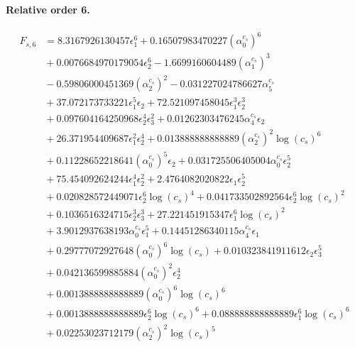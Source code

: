 \documentclass[10pt]{article}
\begin{document}
\paragraph{Relative order 6.}
\begin{align*}
F_{s,6} &= 8.3167926130457 \epsilon_{1}^{6} + 0.16507983470227 \left(\alpha_{0}^{c_s}\right)^{6} \\
&{}  + 0.0076684970179054 \epsilon_{2}^{6} - 1.6699160604489 \left(\alpha_{1}^{c_s}\right)^{3} \\
&{}  - 0.59806000451369 \left(\alpha_{2}^{c_s}\right)^{2} - 0.031227024786627 \alpha_{5}^{c_s} \\
&{}  + 37.072173733221 \epsilon_{1}^{5} \epsilon_{2} + 72.521097458045 \epsilon_{1}^{3} \epsilon_{2}^{3} \\
&{}  + 0.097604164250968 \epsilon_{2}^{4} \epsilon_{3}^{2} + 0.01262303476245 \alpha_{4}^{c_s} \epsilon_{2} \\
&{}  + 26.371954409687 \epsilon_{1}^{2} \epsilon_{2}^{4} + 0.013888888888889 \left(\alpha_{2}^{c_s}\right)^{2} \log{\left(c_{s} \right)}^{6} \\
&{}  + 0.11228652218641 \left(\alpha_{0}^{c_s}\right)^{5} \epsilon_{2} + 0.031725506405004 \alpha_{0}^{c_s} \epsilon_{2}^{5} \\
&{}  + 75.454092624244 \epsilon_{1}^{4} \epsilon_{2}^{2} + 2.4764082020822 \epsilon_{1} \epsilon_{2}^{5} \\
&{}  + 0.020828572449071 \epsilon_{2}^{6} \log{\left(c_{s} \right)}^{4} + 0.041733502892564 \epsilon_{2}^{6} \log{\left(c_{s} \right)}^{2} \\
&{}  + 0.1036516324715 \epsilon_{2}^{3} \epsilon_{3}^{3} + 27.221451915347 \epsilon_{1}^{6} \log{\left(c_{s} \right)}^{2} \\
&{}  + 3.9012937638193 \alpha_{0}^{c_s} \epsilon_{1}^{5} + 0.14451286340115 \alpha_{4}^{c_s} \epsilon_{1} \\
&{}  + 0.29777072927648 \left(\alpha_{0}^{c_s}\right)^{6} \log{\left(c_{s} \right)} + 0.010323841911612 \epsilon_{2} \epsilon_{3}^{5} \\
&{}  + 0.042136599885884 \left(\alpha_{0}^{c_s}\right)^{2} \epsilon_{2}^{4} \\
&{}  + 0.0013888888888889 \left(\alpha_{0}^{c_s}\right)^{6} \log{\left(c_{s} \right)}^{6} \\
&{}  + 0.0013888888888889 \epsilon_{2}^{6} \log{\left(c_{s} \right)}^{6} + 0.088888888888889 \epsilon_{1}^{6} \log{\left(c_{s} \right)}^{6} \\
&{}  + 0.02253023712179 \left(\alpha_{2}^{c_s}\right)^{2} \log{\left(c_{s} \right)}^{5} \\

\end{align*}
\end{document}
